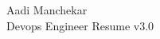 \documentclass{article}
\begin{document}
\begin{center}
    \Huge Aadi Manchekar \\
    \Large Devops Engineer Resume v3.0
\end{center}
\end{document}
